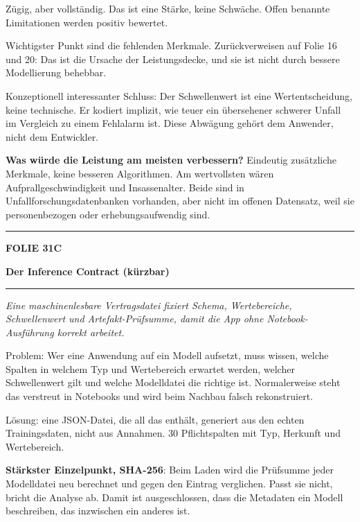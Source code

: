 \documentclass[9pt]{extarticle}
\newcommand{\karte}[3]{%
  \clearpage
  {\color{Accent}\rule{\linewidth}{2.4pt}}\par\vspace{2.5pt}
  {\fontsize{8}{9}\selectfont\bfseries\color{Accent}%
   FOLIE #1\hspace{1.2em}\textbar\hspace{1.2em}#2}\par\vspace{1pt}
  {\fontsize{16}{18}\selectfont\bfseries\color{AccentDark}#3}\par\vspace{3pt}
  {\color{Accent!45}\rule{\linewidth}{0.5pt}}\par\vspace{4pt}%
}
\newcommand{\rubrik}[1]{%
  \vspace{3.5pt}{\fontsize{7.5}{8.5}\selectfont\bfseries\color{Grau}%
  \MakeUppercase{#1}}\par\vspace{1.5pt}}
\newcommand{\kernsatz}[1]{%
  \begin{tcolorbox}[enhanced,sharp corners,boxrule=0pt,
    leftrule=2.2pt,colframe=Accent,colback=AccentPale,
    left=5pt,right=5pt,top=3.5pt,bottom=3.5pt,before skip=1pt,after skip=2pt]
    \color{AccentDark}\itshape #1
  \end{tcolorbox}}
\newcommand{\frage}[2]{\item \textbf{\color{AccentDark}#1} #2}
\begin{document}
\rubrik{Sagen}
\begin{sag}
  \item Zügig, aber vollständig. Das ist eine Stärke, keine Schwäche. Offen benannte
        Limitationen werden positiv bewertet.
  \item Wichtigster Punkt sind die fehlenden Merkmale. Zurückverweisen auf Folie 16 und 20:
        Das ist die Ursache der Leistungsdecke, und sie ist nicht durch bessere Modellierung
        behebbar.
  \item Konzeptionell interessanter Schluss: Der Schwellenwert ist eine Wertentscheidung, keine
        technische. Er kodiert implizit, wie teuer ein übersehener schwerer Unfall im Vergleich
        zu einem Fehlalarm ist. Diese Abwägung gehört dem Anwender, nicht dem Entwickler.
\end{sag}

\rubrik{Wenn gefragt}
\begin{begriff}
  \frage{Was würde die Leistung am meisten verbessern?}{Eindeutig zusätzliche Merkmale, keine
    besseren Algorithmen. Am wertvollsten wären Aufprallgeschwindigkeit und Insassenalter. Beide
    sind in Unfallforschungsdatenbanken vorhanden, aber nicht im offenen Datensatz, weil sie
    personenbezogen oder erhebungsaufwendig sind.}
\end{begriff}

\karte{31}{C}{Der Inference Contract \textnormal{\small(kürzbar)}}

\kernsatz{Eine maschinenlesbare Vertragsdatei fixiert Schema, Wertebereiche, Schwellenwert und
Artefakt-Prüfsumme, damit die App ohne Notebook-Ausführung korrekt arbeitet.}

\rubrik{Sagen}
\begin{sag}
  \item Problem: Wer eine Anwendung auf ein Modell aufsetzt, muss wissen, welche Spalten in
        welchem Typ und Wertebereich erwartet werden, welcher Schwellenwert gilt und welche
        Modelldatei die richtige ist. Normalerweise steht das verstreut in Notebooks und wird
        beim Nachbau falsch rekonstruiert.
  \item Lösung: eine JSON-Datei, die all das enthält, generiert aus den echten Trainingsdaten,
        nicht aus Annahmen. 30 Pflichtspalten mit Typ, Herkunft und Wertebereich.
  \item \textbf{Stärkster Einzelpunkt, SHA-256}: Beim Laden wird die Prüfsumme jeder Modelldatei
        neu berechnet und gegen den Eintrag verglichen. Passt sie nicht, bricht die Analyse ab.
        Damit ist ausgeschlossen, dass die Metadaten ein Modell beschreiben, das inzwischen ein
        anderes ist.
\end{sag}
\end{document}
